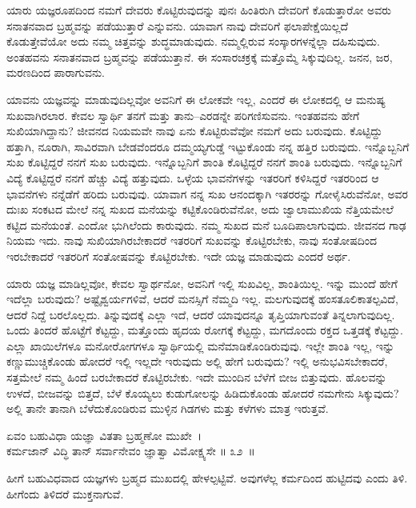 ಯಾರು ಯಜ್ಞರೂಪದಿಂದ ನಮಗೆ ದೇವರು ಕೊಟ್ಟಿರುವುದನ್ನು ಪುನಃ ಹಿಂತಿರುಗಿ ದೇವರಿಗೆ ಕೊಡುತ್ತಾರೋ ಅವರು ಸನಾತನವಾದ ಬ್ರಹ್ಮವನ್ನು ಪಡೆಯುತ್ತಾರೆ ಎನ್ನುವನು. ಯಾವಾಗ ನಾವು ದೇವರಿಗೆ ಫಲಾಪೇಕ್ಷೆಯಿಲ್ಲದೆ ಕೊಡುತ್ತೇವೆಯೋ ಅದು ನಮ್ಮ ಚಿತ್ತವನ್ನು ಶುದ್ಧಮಾಡುವುದು. ನಮ್ಮಲ್ಲಿರುವ ಸಂಸ್ಕಾರಗಳನ್ನೆಲ್ಲಾ ದಹಿಸುವುದು. ಅಂತಹವನು ಸನಾತನವಾದ ಬ್ರಹ್ಮವನ್ನು ಪಡೆಯುತ್ತಾನೆ. ಈ ಸಂಸಾರಚಕ್ರಕ್ಕೆ ಮತ್ತೊಮ್ಮೆ ಸಿಕ್ಕುವುದಿಲ್ಲ. ಜನನ, ಜರ, ಮರಣದಿಂದ ಪಾರಾಗುವನು.

ಯಾವನು ಯಜ್ಞವನ್ನು ಮಾಡುವುದಿಲ್ಲವೋ ಅವನಿಗೆ ಈ ಲೋಕವೇ ಇಲ್ಲ, ಎಂದರೆ ಈ ಲೋಕದಲ್ಲಿ ಆ ಮನುಷ್ಯ ಸುಖವಾಗಿರಲಾರ. ಕೇವಲ ಸ್ವಾರ್ಥಿ ತನಗೆ ಮತ್ತು ತಾನು–ಎರಡನ್ನೇ ಪರಿಗಣಿಸುವನು. ಇಂತಹವನು ಹೇಗೆ ಸುಖಿಯಾಗಿದ್ದಾನು? ಜೀವನದ ನಿಯಮವೇ ನಾವು ಏನು ಕೊಟ್ಟಿರುವೆವೋ ನಮಗೆ ಅದು ಬರುವುದು. ಕೊಟ್ಟಿದ್ದು ಹತ್ತಾಗಿ, ನೂರಾಗಿ, ಸಾವಿರವಾಗಿ ಬೇಡವೆಂದರೂ ದಮ್ಮಯ್ಯಗುಡ್ಡೆ ಇಟ್ಟುಕೊಂಡು ನನ್ನ ಹತ್ತಿರ ಬರುವುದು. ಇನ್ನೊಬ್ಬನಿಗೆ ಸುಖ ಕೊಟ್ಟಿದ್ದರೆ ನನಗೆ ಸುಖ ಬರುವುದು. ಇನ್ನೊಬ್ಬನಿಗೆ ಶಾಂತಿ ಕೊಟ್ಟಿದ್ದರೆ ನನಗೆ ಶಾಂತಿ ಬರುವುದು. ಇನ್ನೊಬ್ಬನಿಗೆ ವಿದ್ಯೆ ಕೊಟ್ಟಿದ್ದರೆ ನನಗೆ ಹೆಚ್ಚು ವಿದ್ಯೆ ಹತ್ತುವುದು. ಒಳ್ಳೆಯ ಭಾವನೆಗಳನ್ನು ಇತರರಿಗೆ ಕಳಿಸಿದ್ದರೆ ಇತರರಿಂದ ಆ ಭಾವನೆಗಳು ನನ್ನೆಡೆಗೆ ಹರಿದು ಬರುವುವು. ಯಾವಾಗ ನನ್ನ ಸುಖ ಆನಂದಕ್ಕಾಗಿ ಇತರರನ್ನು ಗೋಳೈಸಿರುವೆನೋ, ಅವರ ದುಃಖ ಸಂಕಟದ ಮೇಲೆ ನನ್ನ ಸುಖದ ಮನೆಯನ್ನು ಕಟ್ಟಿಕೊಂಡಿರುವೆನೋ, ಅದು ಜ್ವಾಲಾಮುಖಿಯ ನೆತ್ತಿಯಮೇಲೆ ಕಟ್ಟಿದ ಮನೆಯಂತೆ. ಎಂದೋ ಭುಗಿಲೆಂದು ಕಾರುವುದು. ನಮ್ಮ ಸುಖದ ಮನೆ ಬೂದಿಪಾಲಾಗುವುದು. ಜೀವನದ ಗಾಢ ನಿಯಮ ಇದು. ನಾವು ಸುಖಿಯಾಗಿರಬೇಕಾದರೆ ಇತರರಿಗೆ ಸುಖವನ್ನು ಕೊಟ್ಟಿರಬೇಕು, ನಾವು ಸಂತೋಷದಿಂದ ಇರಬೇಕಾದರೆ ಇತರರಿಗೆ ಸಂತೋಷವನ್ನು ಕೊಟ್ಟಿರಬೇಕು. ಇದೇ ಯಜ್ಞ ಮಾಡುವುದು ಎಂದರೆ ಅರ್ಥ.

ಯಾರು ಯಜ್ಞ ಮಾಡಿಲ್ಲವೋ, ಕೇವಲ ಸ್ವಾರ್ಥನೋ, ಅವನಿಗೆ ಇಲ್ಲಿ ಸುಖವಿಲ್ಲ, ಶಾಂತಿ\-ಯಿಲ್ಲ. ಇನ್ನು ಮುಂದೆ ಹೇಗೆ ಇದೆಲ್ಲಾ ಬರುವುದು? ಅಷ್ಟೈಶ್ವರ್ಯಗಳಿವೆ, ಆದರೆ ಮನಸ್ಸಿಗೆ ನೆಮ್ಮದಿ ಇಲ್ಲ. ಮಲಗುವುದಕ್ಕೆ ಹಂಸತೂಲಿಕಾತಲ್ಪವಿದೆ, ಆದರೆ ನಿದ್ದೆ ಬರಲೊಲ್ಲದು. ತಿನ್ನುವುದಕ್ಕೆ ಎಲ್ಲಾ ಇದೆ, ಆದರೆ ಯಾವುದನ್ನೂ ತೃಪ್ತಿಯಾಗುವಂತೆ ತಿನ್ನಲಾಗುವುದಿಲ್ಲ. ಒಂದು ತಿಂದರೆ ಹೊಟ್ಟೆಗೆ ಕೆಟ್ಟದ್ದು, ಮತ್ತೊಂದು ಹೃದಯ ರೋಗಕ್ಕೆ ಕೆಟ್ಟದ್ದು, ಮಗದೊಂದು ರಕ್ತದ ಒತ್ತಡಕ್ಕೆ ಕೆಟ್ಟದ್ದು. ಎಲ್ಲಾ ಖಾಯಿಲೆಗಳೂ ಮನೋರೋಗಗಳೂ ಸ್ವಾರ್ಥಿಯಲ್ಲಿ ಮನೆಮಾಡಿಕೊಂಡಿರುವುವು. ಇಲ್ಲೇ ಶಾಂತಿ ಇಲ್ಲ, ಇನ್ನು ಕಣ್ಣುಮುಚ್ಚಿಕೊಂಡು ಹೋದರೆ ಇಲ್ಲಿ ಇಲ್ಲದೇ ಇರುವುದು ಅಲ್ಲಿ ಹೇಗೆ ಬರುವುದು? ಇಲ್ಲಿ ಅನುಭವಿಸಬೇಕಾದರೆ, ಸತ್ತಮೇಲೆ ನಮ್ಮ ಹಿಂದೆ ಬರಬೇಕಾದರೆ ಕೊಟ್ಟಿರಬೇಕು. ಇದೇ ಮುಂದಿನ ಬೆಳೆಗೆ ಬೀಜ ಬಿತ್ತುವುದು. ಹೊಲವನ್ನು ಉಳದೆ, ಬೀಜವನ್ನು ಬಿತ್ತದೆ, ಬೆಳೆ ಕೊಯ್ಯಲು ಕುಡುಗೋಲನ್ನು ಹಿಡಿದುಕೊಂಡು ಹೋದರೆ ನಮಗೇನು ಸಿಕ್ಕುವುದು? ಅಲ್ಲಿ ತಾನೇ ತಾನಾಗಿ ಬೆಳೆದುಕೊಂಡಿರುವ ಮುಳ್ಳಿನ ಗಿಡಗಳು ಮತ್ತು ಕಳೆಗಳು ಮಾತ್ರ ಇರುತ್ತವೆ.

\begin{shloka}
ಏವಂ ಬಹುವಿಧಾ ಯಜ್ಞಾ ವಿತತಾ ಬ್ರಹ್ಮಣೋ ಮುಖೇ~।\\ಕರ್ಮಜಾನ್ ವಿದ್ಧಿ ತಾನ್ ಸರ್ವಾನೇವಂ ಜ್ಞಾತ್ವಾ ವಿಮೋಕ್ಷ್ಯಸೇ \hfill॥ ೩೨~॥
\end{shloka}

\begin{artha}
ಹೀಗೆ ಬಹುವಿಧವಾದ ಯಜ್ಞಗಳು ಬ್ರಹ್ಮದ ಮುಖದಲ್ಲಿ ಹೇಳಲ್ಪಟ್ಟಿವೆ. ಅವುಗಳೆಲ್ಲ ಕರ್ಮದಿಂದ ಹುಟ್ಟಿದವು ಎಂದು ತಿಳಿ. ಹೀಗೆಂದು ತಿಳಿದರೆ ಮುಕ್ತನಾಗುವೆ.
\end{artha}

